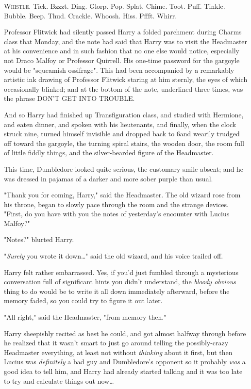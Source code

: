 
\lettrine{W}{histle}. Tick.
Bzzzt. Ding. Glorp. Pop. Splat. Chime. Toot. Puff. Tinkle. Bubble. Beep. Thud.
Crackle. Whoosh. Hiss. Pffft. Whirr.

Professor Flitwick had silently passed Harry a folded parchment during Charms
class that Monday, and the note had said that Harry was to visit the Headmaster
at his convenience and in such fashion that no one else would notice,
especially not Draco Malfoy or Professor Quirrell. His one-time password for
the gargoyle would be "squeamish ossifrage". This had been accompanied by a
remarkably artistic ink drawing of Professor Flitwick staring at him sternly,
the eyes of which occasionally blinked; and at the bottom of the note,
underlined three times, was the phrase DON’T GET INTO TROUBLE.

And so Harry had finished up Transfiguration class, and studied with Hermione,
and eaten dinner, and spoken with his lieutenants, and finally, when the clock
struck nine, turned himself invisible and dropped back to 6\PM and wearily
trudged off toward the gargoyle, the turning spiral stairs, the wooden door,
the room full of little fiddly things, and the silver-bearded figure of the
Headmaster.

This time, Dumbledore looked quite serious, the customary smile absent; and he
was dressed in pajamas of a darker and more sober purple than usual.

"Thank you for coming, Harry," said the Headmaster. The old wizard rose from
his throne, began to slowly pace through the room and the strange devices.
"First, do you have with you the notes of yesterday’s encounter with Lucius
Malfoy?"

"Notes?" blurted Harry.

"\emph{Surely} you wrote it down…" said the old wizard, and his voice
trailed off.

Harry felt rather embarrassed. Yes, if you’d just fumbled through a mysterious
conversation full of significant hints you didn’t understand, the \emph{bloody
obvious} thing to do would be to write it all down immediately afterward,
before the memory faded, so you could try to figure it out later.

"All right," said the Headmaster, "from memory then."

Harry sheepishly recited as best he could, and got almost halfway through
before he realized that it wasn’t smart to just go around telling the
possibly-crazy Headmaster everything, at least not without \emph{thinking}
about it first, but then Lucius was \emph{definitely} a bad guy and
Dumbledore’s opponent so it probably \emph{was} a good idea to tell him, and
Harry had already started talking and it was too late to try and calculate
things out now…

